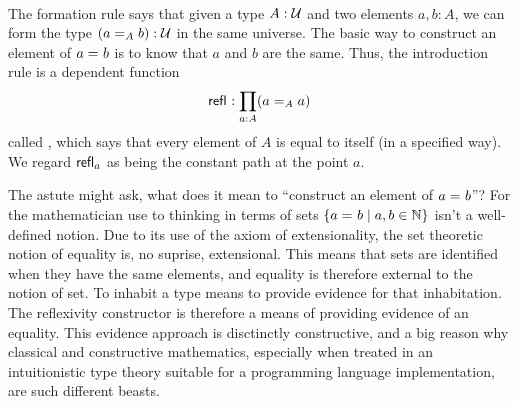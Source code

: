 \begin{code}[hide]%
\>[0]\AgdaSpace{}%
\AgdaSpace{}%
\<%
\end{code}
\begin{code}%
\>[0][@{}l@{\AgdaIndent{1}}]%
\>[2]\AgdaSpace{}%
\AgdaSpace{}%
\AgdaSymbol{\{}\AgdaSpace{}%
\AgdaSymbol{:}\AgdaSpace{}%
\AgdaSymbol{\}}\AgdaSpace{}%
\AgdaSymbol{:}\AgdaSpace{}%
\AgdaSymbol{(}\AgdaSpace{}%
\AgdaSpace{}%
\AgdaSymbol{:}\AgdaSpace{}%
\AgdaSymbol{)}\AgdaSpace{}%
\AgdaSpace{}%
\AgdaSpace{}%
\<%
\\
\>[2][@{}l@{\AgdaIndent{0}}]%
\>[4]\AgdaSpace{}%
\AgdaSymbol{:}\AgdaSpace{}%
\AgdaSymbol{(}\AgdaSpace{}%
\AgdaSymbol{:}\AgdaSpace{}%
\AgdaSymbol{)}\AgdaSpace{}%
\AgdaSpace{}%
\AgdaSpace{}%
\AgdaSpace{}%
\<%
\end{code}
\begin{definition}
  The formation rule says that given a type $A:\UU$ and two elements $a,b:A$, we can form the type $(\id[A]{a}{b}):\UU$ in the same universe.
  The basic way to construct an element of $\id{a}{b}$ is to know that $a$ and $b$ are the same.
  Thus, the introduction rule is a dependent function
  \[\refl{} : \prod_{a:A} (\id[A]{a}{a}) \]
  called ,
  which says that every element of $A$ is equal to itself (in a specified way).  We regard $\refl{a}$ as being the
  constant path %
  at the point $a$.
\end{definition}


The astute might ask, what
does it mean to ``construct an element of $\id{a}{b}$''? For the mathematician
use to thinking in terms of sets $\{\id{a}{b} \mid a,b \in \mathbb{N} \}$ isn't
a well-defined notion. Due to its use of the axiom of extensionality, the set
theoretic notion of equality is, no suprise, extensional.  This means that sets
are identified when they have the same elements, and equality is therefore
external to the notion of set. To inhabit a type means to provide evidence for
that inhabitation. The reflexivity constructor is therefore a means of
providing evidence of an equality. This evidence approach is disctinctly
constructive, and a big reason why classical and constructive mathematics,
especially when treated in an intuitionistic type theory suitable for a
programming language implementation, are such different beasts.

